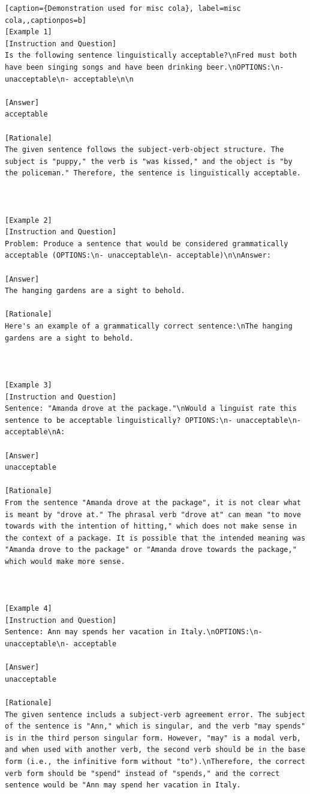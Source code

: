 \begin{lstlisting}[caption={Demonstration used for misc cola}, label=misc cola,,captionpos=b]
[Example 1]
[Instruction and Question]
Is the following sentence linguistically acceptable?\nFred must both have been singing songs and have been drinking beer.\nOPTIONS:\n- unacceptable\n- acceptable\n\n

[Answer]
acceptable

[Rationale]
The given sentence follows the subject-verb-object structure. The subject is "puppy," the verb is "was kissed," and the object is "by the policeman." Therefore, the sentence is linguistically acceptable.



[Example 2]
[Instruction and Question]
Problem: Produce a sentence that would be considered grammatically acceptable (OPTIONS:\n- unacceptable\n- acceptable)\n\nAnswer: 

[Answer]
The hanging gardens are a sight to behold.

[Rationale]
Here's an example of a grammatically correct sentence:\nThe hanging gardens are a sight to behold.



[Example 3]
[Instruction and Question]
Sentence: "Amanda drove at the package."\nWould a linguist rate this sentence to be acceptable linguistically? OPTIONS:\n- unacceptable\n- acceptable\nA: 

[Answer]
unacceptable

[Rationale]
From the sentence "Amanda drove at the package", it is not clear what is meant by "drove at." The phrasal verb "drove at" can mean "to move towards with the intention of hitting," which does not make sense in the context of a package. It is possible that the intended meaning was "Amanda drove to the package" or "Amanda drove towards the package," which would make more sense.



[Example 4]
[Instruction and Question]
Sentence: Ann may spends her vacation in Italy.\nOPTIONS:\n- unacceptable\n- acceptable

[Answer]
unacceptable

[Rationale]
The given sentence includs a subject-verb agreement error. The subject of the sentence is "Ann," which is singular, and the verb "may spends" is in the third person singular form. However, "may" is a modal verb, and when used with another verb, the second verb should be in the base form (i.e., the infinitive form without "to").\nTherefore, the correct verb form should be "spend" instead of "spends," and the correct sentence would be "Ann may spend her vacation in Italy.




\end{lstlisting}
